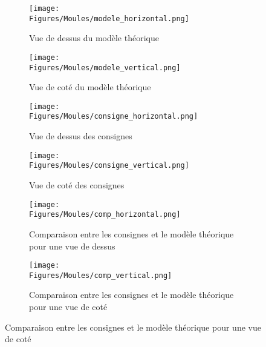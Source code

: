 \documentclass[\main/main.tex]{subfiles}
\begin{document}
\begin{figure}[h!]
    \centering
    \begin{subfigure}[b]{0.45\textwidth}
       \centering \caption{
            \label{fig:coupe:model:horizontal}
            Vue de dessus du modèle théorique
            }
       \centering \texttt{[image: \\Figures/Moules/modele\_horizontal.png]}
    \end{subfigure}
    \begin{subfigure}[b]{0.45\textwidth}
       \centering \caption{
            \label{fig:coupe:model:vertical}
            Vue de coté du modèle théorique
            }
       \centering \texttt{[image: \\Figures/Moules/modele\_vertical.png]}
    \end{subfigure}
    \begin{subfigure}[b]{0.45\textwidth}
       \centering \caption{
            \label{fig:coupe:slicing:horizontal}
            Vue de dessus des consignes
            }
       \centering \texttt{[image: \\Figures/Moules/consigne\_horizontal.png]}
    \end{subfigure}
    \begin{subfigure}[b]{0.45\textwidth}
       \centering \caption{
            \label{fig:coupe:slicing:vertical}
            Vue de coté des consignes
            }
       \centering \texttt{[image: \\Figures/Moules/consigne\_vertical.png]}
    \end{subfigure}
    \begin{subfigure}[b]{0.45\textwidth}
       \centering \caption{
            \label{fig:coupe:comp:horizontal}
            Comparaison entre les consignes et le modèle théorique pour une vue de dessus
            }
       \centering \texttt{[image: \\Figures/Moules/comp\_horizontal.png]}
    \end{subfigure}
    \begin{subfigure}[b]{0.45\textwidth}
       \centering \caption{
            \label{fig:coupe:comp:vertical}
            Comparaison entre les consignes et le modèle théorique pour une vue de coté
            }
       \centering \texttt{[image: \\Figures/Moules/comp\_vertical.png]}
    \end{subfigure}
    

\end{figure}
\end{document}
